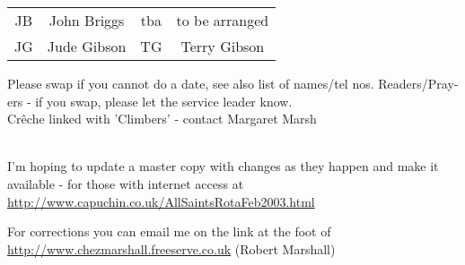 \documentclass[10pt,a4paper]{article}
\begin{document}
\begin{landscape}
\begin{center}
{\begin{tabular}{|l|p{2cm}|p{1.4cm}|p{1.0cm}|p{0.8cm}|p{3.4cm}|p{2cm}|p{1.5cm}|p{2cm}|p{2cm}|p{1.9cm}
|p{2cm}|p{1.8cm}|}
\hline
\end{tabular}
}

\begin{tabular}{|c|c|c|c|}\hline
JB & John Briggs &  tba & to be arranged  \\ %
JG  & Jude Gibson & TG & Terry Gibson 
  \\ \hline
\end{tabular}
\end{center}
\vspace{1em}
Please swap if you cannot do a date, see also list of names/tel nos.
Readers/Pray-ers - if you swap, please let the service leader know.\\
Cr\^{e}che linked with 'Climbers' - contact Margaret Marsh
{\\ \footnotesize I'm hoping to update a master copy with changes as they
happen and make it available - for those with internet access at
\url{http://www.capuchin.co.uk/AllSaintsRotaFeb2003.html} 


\begin{htmlonly}
For corrections you can email me on the link at the foot of
\url{http://www.chezmarshall.freeserve.co.uk} (Robert Marshall)


\end{htmlonly}}
\end{landscape}
\end{document}
